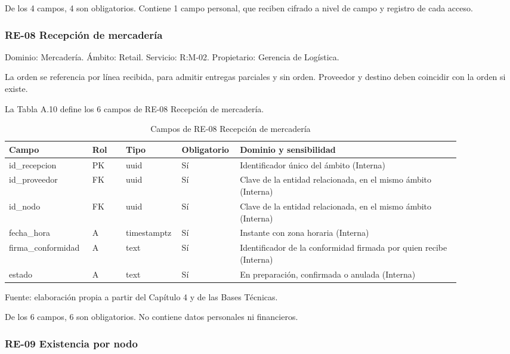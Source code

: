 \documentclass[11pt]{article}
\begin{document}
De los 4 campos, 4 son obligatorios. Contiene 1 campo personal, que reciben cifrado a nivel de campo y registro de cada acceso.

\subsubsection{RE-08 Recepción de mercadería}

Dominio: Mercadería. Ámbito: Retail. Servicio: R:M-02. Propietario: Gerencia de Logística.

La orden se referencia por línea recibida, para admitir entregas parciales y sin orden. Proveedor y destino deben coincidir con la orden si existe.

La Tabla A.10 define los 6 campos de RE-08 Recepción de mercadería.

\begin{table}[htbp]
\caption{Campos de RE-08 Recepción de mercadería}\label{tab:d_re08}
\centering
\begin{tabular}{@{}p{0.167\linewidth}p{0.070\linewidth}p{0.079\linewidth}p{0.097\linewidth}p{0.465\linewidth}@{}}
\toprule Campo & Rol & Tipo & Obligatorio & Dominio y sensibilidad \\
\midrule
id\_recepcion & PK & uuid & Sí & Identificador único del ámbito (Interna) \\
id\_proveedor & FK & uuid & Sí & Clave de la entidad relacionada, en el mismo ámbito (Interna) \\
id\_nodo & FK & uuid & Sí & Clave de la entidad relacionada, en el mismo ámbito (Interna) \\
fecha\_hora & A & timestamptz & Sí & Instante con zona horaria (Interna) \\
firma\_conformidad & A & text & Sí & Identificador de la conformidad firmada por quien recibe (Interna) \\
estado & A & text & Sí & En preparación, confirmada o anulada (Interna) \\
\bottomrule
\end{tabular}
\par\smallskip
{\raggedright Fuente: elaboración propia a partir del Capítulo 4 y de las Bases Técnicas.\par}
\end{table}


De los 6 campos, 6 son obligatorios. No contiene datos personales ni financieros.

\subsubsection{RE-09 Existencia por nodo}
\end{document}
